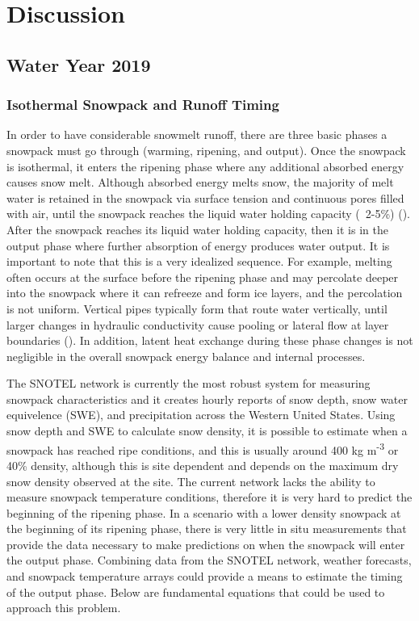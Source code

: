 \chapter{Discussion}
\section{Water Year 2019} 
\subsection{Isothermal Snowpack and Runoff Timing}
In order to have considerable snowmelt runoff, there are three basic phases a snowpack must go through (warming, ripening, and output). Once the snowpack is isothermal, it enters the ripening phase where any additional absorbed energy causes snow melt. Although absorbed energy melts snow, the majority of melt water is retained in the snowpack via surface tension and continuous pores filled with air, until the snowpack reaches the liquid water holding capacity (~2-5\%) (\cite{dingman2015}). After the snowpack reaches its liquid water holding capacity, then it is in the output phase where further absorption of energy produces water output. It is important to note that this is a very idealized sequence. For example, melting often occurs at the surface before the ripening phase and may percolate deeper into the snowpack where it can refreeze and form ice layers, and the percolation is not uniform.  Vertical pipes typically form that route water vertically, until larger changes in hydraulic conductivity cause pooling or lateral flow at layer boundaries (\cite{evans2016isotopic, eiriksson2013evaluation}). In addition, latent heat exchange during these phase changes is not negligible in the overall snowpack energy balance and internal processes. 

The SNOTEL network is currently the most robust system for measuring snowpack characteristics and it creates hourly reports of snow depth, snow water equivelence (SWE), and precipitation across the Western United States. Using snow depth and SWE to calculate snow density, it is possible to estimate when a snowpack has reached ripe conditions, and this is usually around 400 kg m\textsuperscript{-3} or 40\% density, although this is site dependent and depends on the maximum dry snow density observed at the site. The current network lacks the ability to measure snowpack temperature conditions, therefore it is very hard to predict the beginning of the ripening phase. In a scenario with a lower density snowpack at the beginning of its ripening phase, there is very little in situ measurements that provide the data necessary to make predictions on when the snowpack will enter the output phase. Combining data from the SNOTEL network, weather forecasts, and snowpack temperature arrays could provide a means to estimate the timing of the output phase. Below are fundamental equations that could be used to approach this problem. 

